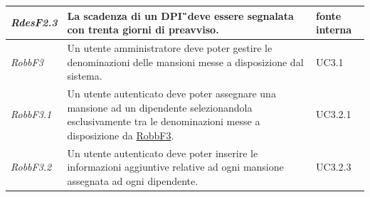 \begin{flushleft}
\begin{tabular}{|l{2cm}|l{8cm}|l{2cm}|}
		\hline
		\label{RdesF2.3}
		\textit{RdesF2.3} & La scadenza di un \gls{DPI}\G\ deve essere segnalata con trenta giorni di preavviso. & fonte interna \\
		\hline
		\label{RobbF3}
		\textit{RobbF3} & Un utente amministratore deve poter gestire le denominazioni delle mansioni messe a disposizione dal sistema. & UC3.1\\
		\hline
		\label{RobbF3.1}
		\textit{RobbF3.1} & Un utente autenticato deve poter assegnare una mansione ad un dipendente selezionandola esclusivamente tra le denominazioni messe a disposizione da \hyperref[RobbF3]{RobbF3}. & UC3.2.1 \\
		\hline
		\label{RobbF3.2}
		\textit{RobbF3.2} & Un utente autenticato deve poter inserire le informazioni aggiuntive relative ad ogni mansione assegnata ad ogni dipendente. & UC3.2.3\\
		\hline
	\end{tabular}
\end{flushleft}
\newpage

